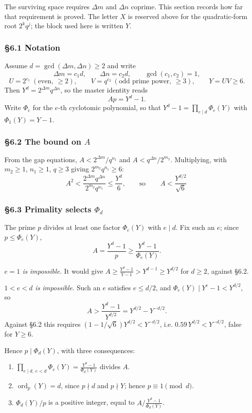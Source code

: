 \documentclass[11pt]{article}
\begin{document}
The surviving space requires $\Delta m$ and $\Delta n$ coprime. This section records how far that requirement is proved. The letter $X$ is reserved above for the quadratic-form root $2^k q^j$; the block used here is written $Y$.

\subsubsection*{\S6.1 Notation}

Assume $d = \gcd(\Delta m, \Delta n) \geq 2$ and write
\[
\Delta m = c_1 d, \qquad \Delta n = c_2 d, \qquad \gcd(c_1,c_2) = 1,
\]
\[
U = 2^{c_1} \ (\text{even}, \ \geq 2), \qquad V = q^{c_2} \ (\text{odd prime power}, \ \geq 3), \qquad Y = UV \geq 6 .
\]
Then $Y^d = 2^{\Delta m} q^{\Delta n}$, so the master identity reads
\[
A p = Y^d - 1 .
\]
Write $\Phi_e$ for the $e$-th cyclotomic polynomial, so that $Y^d - 1 = \prod_{e \mid d} \Phi_e(Y)$ with $\Phi_1(Y) = Y-1$.

\subsubsection*{\S6.2 The bound on $A$}

From the gap equations, $A < 2^{\Delta m}/q^{n_1}$ and $A < q^{\Delta n}/2^{m_2}$. Multiplying, with $m_2 \geq 1$, $n_1 \geq 1$, $q \geq 3$ giving $2^{m_2} q^{n_1} \geq 6$:
\[
A^2 < \frac{2^{\Delta m} q^{\Delta n}}{2^{m_2} q^{n_1}} \leq \frac{Y^d}{6},
\qquad\text{so}\qquad
\boxed{\,A < \frac{Y^{d/2}}{\sqrt 6}\,}
\]

\subsubsection*{\S6.3 Primality selects $\Phi_d$}

The prime $p$ divides at least one factor $\Phi_e(Y)$ with $e \mid d$. Fix such an $e$; since $p \leq \Phi_e(Y)$,
\[
A = \frac{Y^d - 1}{p} \geq \frac{Y^d-1}{\Phi_e(Y)} .
\]

\emph{$e = 1$ is impossible.} It would give $A \geq \frac{Y^d-1}{Y-1} > Y^{d-1} \geq Y^{d/2}$ for $d \geq 2$, against \S6.2.

\emph{$1 < e < d$ is impossible.} Such an $e$ satisfies $e \leq d/2$, and $\Phi_e(Y) \mid Y^e - 1 < Y^{d/2}$, so
\[
A > \frac{Y^d-1}{Y^{d/2}} = Y^{d/2} - Y^{-d/2} .
\]
Against \S6.2 this requires $\left(1 - 1/\sqrt6\right) Y^{d/2} < Y^{-d/2}$, i.e. $0.59\,Y^{d/2} < Y^{-d/2}$, false for $Y \geq 6$.

Hence $p \mid \Phi_d(Y)$, with three consequences:
\begin{enumerate}
\item[(C1)] $\displaystyle \prod_{e \mid d,\ e < d} \Phi_e(Y) = \frac{Y^d-1}{\Phi_d(Y)}$ divides $A$.
\item[(C2)] $\operatorname{ord}_p(Y) = d$, since $p \nmid d$ and $p \nmid Y$; hence $p \equiv 1 \pmod d$.
\item[(C3)] $\Phi_d(Y)/p$ is a positive integer, equal to $A \big/ \frac{Y^d-1}{\Phi_d(Y)}$.
\end{enumerate}
\end{document}
